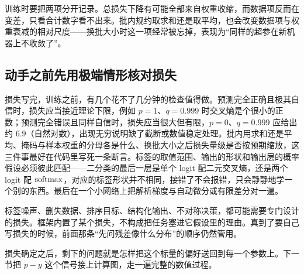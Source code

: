 训练时要把两项分开记录。总损失下降有可能全部来自权重收缩，而数据项反而在变差，只看合计数字看不出来。批内规约取求和还是取平均，也会改变数据项与权重衰减的相对尺度——换批大小时这一项经常被忘掉，表现为``同样的超参在新机器上不收敛了''。

\subsection{动手之前先用极端情形核对损失}

损失写完，训练之前，有几个花不了几分钟的检查值得做。预测完全正确且极其自信时，损失应当接近理论下限，例如 \(p=1\)、\(q=0.999\) 时交叉熵是个很小的正数；预测完全错误且同样自信时，损失应当很大但有限，\(p=0\)、\(q=0.999\) 应给出约 \(6.9\)（自然对数），出现无穷说明缺了截断或数值稳定处理。批内用求和还是平均、掩码与样本权重的分母各是什么、换批大小之后损失量级是否按预期缩放，这三件事最好在代码里写死一条断言。标签的取值范围、输出的形状和输出层的概率假设必须彼此匹配——二分类的最后一层是单个 logit 配二元交叉熵，还是两个 logit 配 \(\operatorname{softmax}\)，对应的标签形状并不相同，接错了不会报错，只会静静地学一个别的东西。最后在一个小网络上把解析梯度与自动微分或有限差分对一遍。

标签噪声、删失数据、排序目标、结构化输出、不对称决策，都可能需要专门设计的损失。框架内置了某个损失，不构成把任务塞进它假设里的理由。真到了要自己写损失的时候，前面那条``先问残差像什么分布''的顺序仍然管用。

损失确定之后，剩下的问题就是怎样把这个标量的偏好送回到每一个参数上。下一节把 \(p-y\) 这个信号接上计算图，走一遍完整的数值过程。
